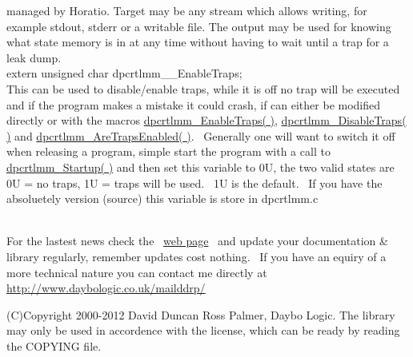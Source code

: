 \documentclass{article}
\begin{document}
managed by Horatio. Target may be any stream which allows writing, for
example stdout, stderr or a writable file. The output may be used for
knowing
what state memory is in at any time without having to wait until a trap
for a leak dump.
\\
extern unsigned char dpcrtlmm\_\_EnableTraps;
\\
This can be used to disable/enable traps, while it is off no trap will
be executed and if the program makes a mistake it could crash, if can
either
be modified directly or with the macros \href{#EnableTraps}{dpcrtlmm\_EnableTraps(
)}, \href{#DisableTraps}{dpcrtlmm\_DisableTraps( )} and \href{#AreTrapsEnabled}{dpcrtlmm\_AreTrapsEnabled(
)}.~ Generally one will want to switch it off when releasing a
program, simple start the program with a call to \href{#Startup}{dpcrtlmm\_Startup(
)} and then set this variable to 0U, the two valid states are 0U =
no
traps, 1U = traps will be used.~ 1U is the default.~ If you
have
the absoluetely version (source) this variable is store in dpcrtlmm.c
\\
~

\par For the lastest news check the~ \href{http://www.daybologic.co.uk/dev/dpcrtlmm}{web
page}~ and update your documentation \& library regularly,
remember
updates cost nothing.~ If you have an equiry of a more technical
nature
you can contact me directly at \href{http://www.daybologic.co.uk/mailddrp/}{\url{http://www.daybologic.co.uk/mailddrp/}}\href{mailto:palmer@overchat.org}{}


\par (C)Copyright 2000-2012 David
Duncan
Ross Palmer, Daybo Logic. The library may only be used in accordence
with
the license, which can be ready by reading the COPYING file.\\
\end{document}
